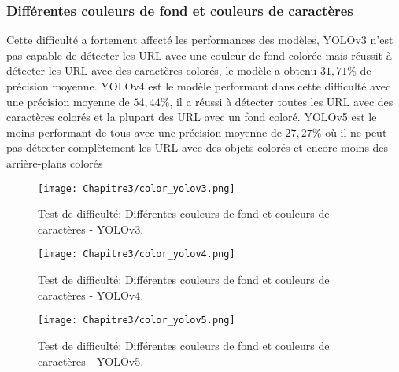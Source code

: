           \subsubsection{Différentes couleurs de fond et couleurs de caractères}
          Cette difficulté a fortement affecté les performances des modèles,
          YOLOv3 n'est pas capable de détecter les URL avec une couleur de fond colorée mais réussit à détecter les URL avec des caractères colorés, le modèle a obtenu $31,71\%$ de précision moyenne.
          YOLOv4 est le modèle performant dans cette difficulté avec une précision moyenne de $54,44\%$, il a réussi à détecter toutes les URL avec des caractères colorés et la plupart des URL avec un fond coloré.
          YOLOv5 est le moins performant de tous avec une précision moyenne de $27,27\%$ où il ne peut pas détecter complètement les URL avec des objets colorés et encore moins des arrière-plans colorés
          \begin{figure}[H]
               \centering
                \texttt{[image: Chapitre3/color\_yolov3.png]}
                \caption{Test de difficulté: Différentes couleurs de fond et couleurs de caractères - YOLOv3.}
                \label{y3_t3}
                \end{figure}
          \begin{figure}[H]
                    \centering
                    \texttt{[image: Chapitre3/color\_yolov4.png]}
                    \caption{Test de difficulté: Différentes couleurs de fond et couleurs de caractères - YOLOv4.}
                    \label{y4_t3}
                    \end{figure}
          \begin{figure}[H]
                    \centering
                    \texttt{[image: Chapitre3/color\_yolov5.png]}
                    \caption{Test de difficulté: Différentes couleurs de fond et couleurs de caractères - YOLOv5.}
                    \label{y5_t3}
                    \end{figure}
          

